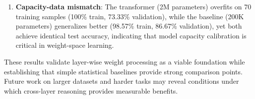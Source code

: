 \begin{enumerate}
\item \textbf{Capacity-data mismatch}: The transformer (2M parameters) overfits on 70 training samples (100\% train, 73.33\% validation), while the baseline (200K parameters) generalizes better (98.57\% train, 86.67\% validation), yet both achieve identical test accuracy, indicating that model capacity calibration is critical in weight-space learning.
\end{enumerate}

These results validate layer-wise weight processing as a viable foundation while establishing that simple statistical baselines provide strong comparison points. Future work on larger datasets and harder tasks may reveal conditions under which cross-layer reasoning provides measurable benefits.
